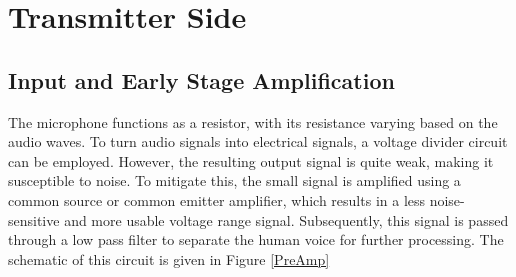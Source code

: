\documentclass[a4paper,10pt]{IEEEtran}
\begin{document}
\section{Transmitter Side}
\subsection{Input and Early Stage Amplification}
The microphone functions as a resistor, with its resistance varying based on the audio waves. To turn audio signals into electrical signals, a voltage divider circuit can be employed. However, the resulting output signal is quite weak, making it susceptible to noise. To mitigate this, the small signal is amplified using a common source or common emitter amplifier, which results in a less noise-sensitive and more usable voltage range signal. Subsequently, this signal is passed through a low pass filter to separate the human voice for further processing. The schematic of this circuit is given in Figure \ref{PreAmp}
\end{document}
